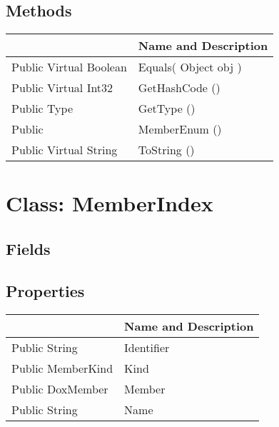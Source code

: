 \documentclass[11pt, oneside, a4paper]{book}
\begin{document}
\subsection{Methods}
\begin{center}
\begin{tabular}{| p{3cm} | p{12cm} | }
\hline
\textbf{ } & \textbf{ Name and Description}\\
\hline
 Public  Virtual  Boolean &  Equals(\hypertarget{SoftwareEngineeringTools.{}Documentation.{}MemberEnum.{}Equals\_Object}{} Object  obj  )\\
\hline
 Public  Virtual  Int32 &  GetHashCode ()\hypertarget{SoftwareEngineeringTools.{}Documentation.{}MemberEnum.{}GetHashCode}{}\\
\hline
 Public  Type &  GetType ()\hypertarget{SoftwareEngineeringTools.{}Documentation.{}MemberEnum.{}GetType}{}\\
\hline
 Public  &  MemberEnum ()\hypertarget{SoftwareEngineeringTools.{}Documentation.{}MemberEnum.{}MemberEnum}{}\\
\hline
 Public  Virtual  String &  ToString ()\hypertarget{SoftwareEngineeringTools.{}Documentation.{}MemberEnum.{}ToString}{}\\
\hline
\end{tabular}
\end{center}
 


\hypertarget{SoftwareEngineeringTools.{}Documentation.{}MemberIndex}{}
\section{Class: MemberIndex}

\subsection{Fields}

\subsection{Properties}
\begin{center}
\begin{tabular}{| p{3cm} | p{12cm} | }
\hline
\textbf{ } & \textbf{ Name and Description}\\
\hline
 Public  String &  Identifier\hypertarget{SoftwareEngineeringTools.{}Documentation.{}MemberIndex.{}Identifier}{}\\
\hline
 Public  MemberKind &  Kind\hypertarget{SoftwareEngineeringTools.{}Documentation.{}MemberIndex.{}Kind}{}\\
\hline
 Public  DoxMember &  Member\hypertarget{SoftwareEngineeringTools.{}Documentation.{}MemberIndex.{}Member}{}\\
\hline
 Public  String &  Name\hypertarget{SoftwareEngineeringTools.{}Documentation.{}MemberIndex.{}Name}{}\\
\hline
\end{tabular}
\end{center}
\end{document}
